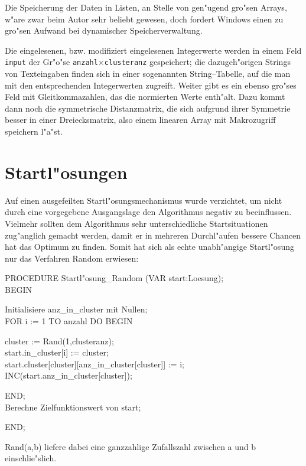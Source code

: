 Die Speicherung der Daten in Listen, 
an Stelle von gen"ugend gro"sen Arrays, 
w"are zwar beim Autor sehr beliebt gewesen, 
doch fordert Windows einen zu gro"sen Aufwand
bei dynamischer Speicherverwaltung.

Die eingelesenen, bzw. modifiziert eingelesenen Integerwerte werden in 
einem Feld {\tt input} der Gr"o"se 
{\tt anzahl$\times$clusteranz} gespeichert;
die dazugeh"origen Strings von Texteingaben finden sich in einer
sogenannten String--Tabelle, auf die man mit den entsprechenden
Integerwerten zugreift. Weiter gibt es ein ebenso gro"ses Feld mit
Gleitkommazahlen, das die normierten Werte enth"alt.
Dazu kommt dann noch die symmetrische Distanzmatrix, die sich aufgrund
ihrer Symmetrie besser in einer Dreiecksmatrix, also einem linearen
Array mit Makrozugriff speichern l"a"st.

\section{Startl"osungen}
Auf einen ausgefeilten Startl"osungsmechanismus wurde verzichtet, um nicht
durch eine vorgegebene Ausgangslage den Algorithmus negativ zu beeinflussen.
Vielmehr sollten dem Algorithmus sehr unterschiedliche Startsituationen
zug"anglich gemacht werden, damit er in mehreren Durchl"aufen bessere
Chancen hat das Optimum zu finden. Somit hat sich als echte unabh"angige
Startl"osung nur das Verfahren Random erwiesen:

\begin{algorithm*}
PROCEDURE Startl"osung\_Random (VAR start:Loesung);\\
BEGIN
\begin{Block}
	Initialisiere anz\_in\_cluster mit Nullen;\\
	FOR i := 1 TO anzahl DO BEGIN
	\begin{Block}
		cluster := Rand(1,clusteranz);\\
		start.in\_cluster[i] := cluster;\\
		start.cluster[cluster][anz\_in\_cluster[cluster]] := i;\\
		INC(start.anz\_in\_cluster[cluster]);
	\end{Block}
	END;\\
	Berechne Zielfunktionswert von start;
\end{Block}
END;
\end{algorithm*}

Rand(a,b) liefere dabei eine ganzzahlige Zufallszahl zwischen a und b
einschlie"slich.


